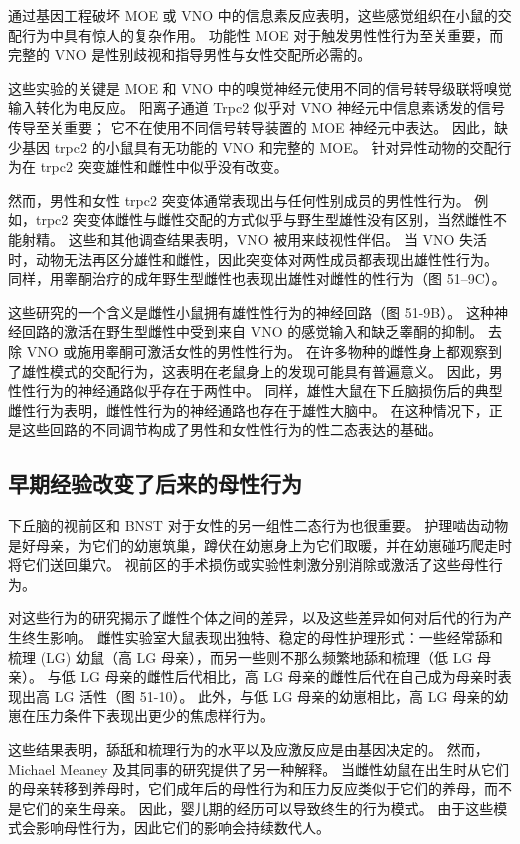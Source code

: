 通过基因工程破坏 MOE 或 VNO 中的信息素反应表明，这些感觉组织在小鼠的交配行为中具有惊人的复杂作用。 功能性 MOE 对于触发男性性行为至关重要，而完整的 VNO 是性别歧视和指导男性与女性交配所必需的。

这些实验的关键是 MOE 和 VNO 中的嗅觉神经元使用不同的信号转导级联将嗅觉输入转化为电反应。 阳离子通道 Trpc2 似乎对 VNO 神经元中信息素诱发的信号传导至关重要； 它不在使用不同信号转导装置的 MOE 神经元中表达。 因此，缺少基因 trpc2 的小鼠具有无功能的 VNO 和完整的 MOE。 针对异性动物的交配行为在 trpc2 突变雄性和雌性中似乎没有改变。

然而，男性和女性 trpc2 突变体通常表现出与任何性别成员的男性性行为。 例如，trpc2 突变体雌性与雌性交配的方式似乎与野生型雄性没有区别，当然雌性不能射精。 这些和其他调查结果表明，VNO 被用来歧视性伴侣。 当 VNO 失活时，动物无法再区分雄性和雌性，因此突变体对两性成员都表现出雄性性行为。 同样，用睾酮治疗的成年野生型雌性也表现出雄性对雌性的性行为（图 51–9C）。

这些研究的一个含义是雌性小鼠拥有雄性性行为的神经回路（图 51-9B）。 这种神经回路的激活在野生型雌性中受到来自 VNO 的感觉输入和缺乏睾酮的抑制。 去除 VNO 或施用睾酮可激活女性的男性性行为。 在许多物种的雌性身上都观察到了雄性模式的交配行为，这表明在老鼠身上的发现可能具有普遍意义。 因此，男性性行为的神经通路似乎存在于两性中。 同样，雄性大鼠在下丘脑损伤后的典型雌性行为表明，雌性性行为的神经通路也存在于雄性大脑中。 在这种情况下，正是这些回路的不同调节构成了男性和女性性行为的性二态表达的基础。

\subsection{早期经验改变了后来的母性行为}
下丘脑的视前区和 BNST 对于女性的另一组性二态行为也很重要。 护理啮齿动物是好母亲，为它们的幼崽筑巢，蹲伏在幼崽身上为它们取暖，并在幼崽碰巧爬走时将它们送回巢穴。 视前区的手术损伤或实验性刺激分别消除或激活了这些母性行为。

对这些行为的研究揭示了雌性个体之间的差异，以及这些差异如何对后代的行为产生终生影响。 雌性实验室大鼠表现出独特、稳定的母性护理形式：一些经常舔和梳理 (LG) 幼鼠（高 LG 母亲），而另一些则不那么频繁地舔和梳理（低 LG 母亲）。 与低 LG 母亲的雌性后代相比，高 LG 母亲的雌性后代在自己成为母亲时表现出高 LG 活性（图 51-10）。 此外，与低 LG 母亲的幼崽相比，高 LG 母亲的幼崽在压力条件下表现出更少的焦虑样行为。

这些结果表明，舔舐和梳理行为的水平以及应激反应是由基因决定的。 然而，Michael Meaney 及其同事的研究提供了另一种解释。 当雌性幼鼠在出生时从它们的母亲转移到养母时，它们成年后的母性行为和压力反应类似于它们的养母，而不是它们的亲生母亲。 因此，婴儿期的经历可以导致终生的行为模式。 由于这些模式会影响母性行为，因此它们的影响会持续数代人。

